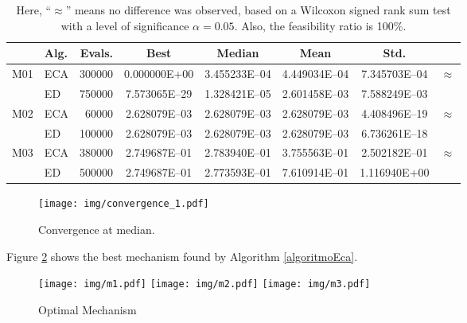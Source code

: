 \documentclass[12pt,letterpape]{article}
\begin{document}
\begin{table}[!ht]
	\centering
	\begin{tabular}{clrccccc}
		\hline
		 & {\bf Alg.} & {\bf Evals}.  & {\bf Best} & {\bf Median} & {\bf Mean} & {\bf Std.} \\ \hline
		\multirow{2}{*}{M01}
		& ECA & 300000  & 0.000000E+00  & 3.455233E--04 & 4.449034E--04 & 7.345703E--04 &
		\multirow{2}{*}{$ \approx $}\\  
		& ED  & 750000  & 7.573065E--29 & 1.328421E--05 & 2.601458E--03 & 7.588249E--03 &  \\ \hline
		\multirow{2}{*}{M02}
		& ECA &  60000  & 2.628079E--03 & 2.628079E--03 & 2.628079E--03 & 4.408496E--19 & 
		\multirow{2}{*}{$ \approx $}\\ 
		& ED  & 100000  & 2.628079E--03 & 2.628079E--03 & 2.628079E--03 & 6.736261E--18 &  \\ \hline
		\multirow{2}{*}{M03}
		& ECA & 380000  & 2.749687E--01 & 2.783940E--01 & 3.755563E--01 & 2.502182E--01 & 
		\multirow{2}{*}{$ \approx $}\\ 
		& ED  & 500000  & 2.749687E--01 & 2.773593E--01 & 7.610914E--01 & 1.116940E+00  &  \\ \hline
	\end{tabular}
	\caption{Here, ``$\approx$'' means no difference was observed, based on a Wilcoxon
	signed rank sum test with a level of significance $\alpha = 0.05$. Also, the feasibility ratio is 100\%.}
	\label{eqn:statRes}
\end{table}

\begin{figure}[!ht]
	\centering
	\texttt{[image: img/convergence\_1.pdf]}
	\caption{Convergence at median.}
	\label{fig:convMedian1}
\end{figure}

Figure \ref{fig:optimalM} shows the best mechanism found by Algorithm \ref{algoritmoEca}.

\begin{figure}[!ht]
	\centering
	\texttt{[image: img/m1.pdf]}
	\texttt{[image: img/m2.pdf]}
	\texttt{[image: img/m3.pdf]}
	\caption{Optimal Mechanism}
	\label{fig:optimalM}
\end{figure}
\end{document}
